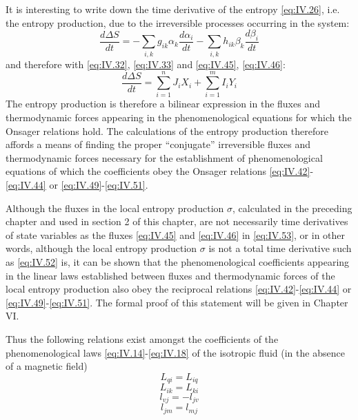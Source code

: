 It is interesting to write down the time derivative of the entropy \eqref{eq:IV.26}, i.e. the entropy production, due to the irreversible processes occurring in the system:
\begin{equation}
\frac{d \Delta S}{d t} = - \sum_{i,k} g_{ik} \alpha_k \frac{d \alpha_i}{dt} - \sum_{i,k} h_{ik} \beta_k \frac{d \beta_i}{dt} 
    \label{eq:IV.52}
\end{equation}
and therefore with \eqref{eq:IV.32}, \eqref{eq:IV.33} and \eqref{eq:IV.45}, \eqref{eq:IV.46}:
\begin{equation}
\frac{d \Delta S}{d t} = \sum_{i=1}^n J_i X_i + \sum_{i=1}^m I_i Y_i
    \label{eq:IV.53}
\end{equation}
The entropy production is therefore a bilinear expression in the fluxes and thermodynamic forces appearing in the phenomenological equations for which the Onsager relations hold. The calculations of the entropy production therefore affords a means of finding the proper ``conjugate'' irreversible fluxes and thermodynamic forces necessary for the establishment of phenomenological equations of which the coefficients obey the Onsager relations \eqref{eq:IV.42}-\eqref{eq:IV.44} or \eqref{eq:IV.49}-\eqref{eq:IV.51}.

Although the fluxes in the local entropy production $\sigma$, calculated in the preceding chapter and used in section 2 of this chapter, are not necessarily time derivatives of state variables as the fluxes \eqref{eq:IV.45} and \eqref{eq:IV.46} in \eqref{eq:IV.53}, or in other words, although the local entropy production $\sigma$ is not a total time derivative such as \eqref{eq:IV.52} is, it can be shown that the phenomenological coefficients appearing in the linear laws established between fluxes and thermodynamic forces of the local entropy production also obey the reciprocal relations \eqref{eq:IV.42}-\eqref{eq:IV.44} or \eqref{eq:IV.49}-\eqref{eq:IV.51}. The formal proof of this statement will be given in Chapter VI.

Thus the following relations exist amongst the coefficients of the phenomenological laws \eqref{eq:IV.14}-\eqref{eq:IV.18} of the isotropic fluid (in the absence
of a magnetic field)
\begin{equation}
L_{qi} = L_{iq} 
    \label{eq:IV.54}
\end{equation}
\begin{equation}
L_{ik} = L_{ki} 
    \label{eq:IV.55}
\end{equation}
\begin{equation}
l_{vj} = -l_{jv} 
    \label{eq:IV.56}
\end{equation}
\begin{equation}
l_{jm} = l_{mj} 
    \label{eq:IV.57}
\end{equation}

